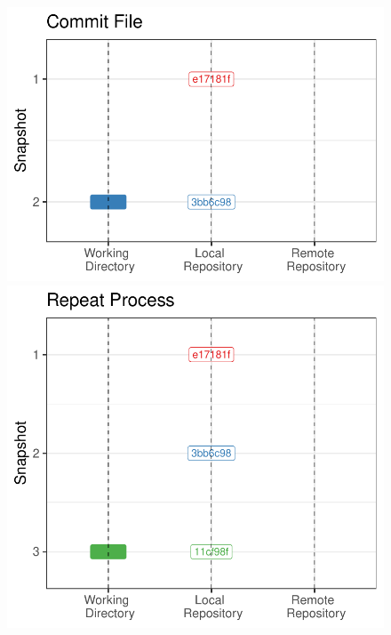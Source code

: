 \documentclass[
  letterpaper,
  DIV=11,
  numbers=noendperiod]{scrreprt}
\begin{document}
\begin{figure}
\begin{minipage}[t]{0.50\linewidth}
{}

\end{minipage}%
\newline
\begin{minipage}[t]{0.50\linewidth}

{\centering 

\includegraphics{basics_files/figure-pdf/unnamed-chunk-9-1.pdf}

}

\end{minipage}%
%
\begin{minipage}[t]{0.50\linewidth}

{\centering 

\includegraphics{basics_files/figure-pdf/unnamed-chunk-10-1.pdf}

}

\end{minipage}%

\end{figure}
\end{document}
